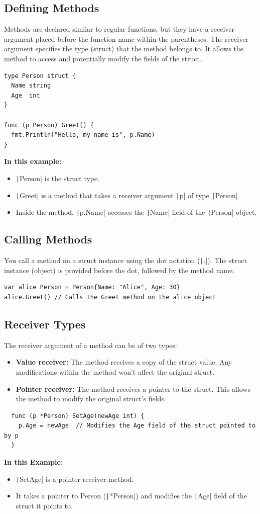 \documentclass[letterpaper,12pt]{article}
\begin{document}
\subsection{Defining Methods}
Methods are declared similar to regular functions, but they have a receiver argument placed before the function name within the parentheses. The receiver argument specifies the type (struct) that the method belongs to. It allows the method to access and potentially modify the fields of the struct.
\begin{verbatim}
type Person struct {
  Name string
  Age  int
}

func (p Person) Greet() {
  fmt.Println("Hello, my name is", p.Name)
}
\end{verbatim}
\textbf{In this example:}
\begin{itemize}
  \item \texttt|Person| is the struct type.
  \item \texttt|Greet| is a method that takes a receiver argument \texttt|p| of type \texttt|Person|.
  \item Inside the method, \texttt|p.Name| accesses the \texttt|Name| field of the \texttt|Person| object.
\end{itemize}
\subsection{Calling Methods}
You call a method on a struct instance using the dot notation (\texttt|.|). The struct instance (object) is provided before the dot, followed by the method name.
\begin{verbatim}
var alice Person = Person{Name: "Alice", Age: 30}
alice.Greet() // Calls the Greet method on the alice object
\end{verbatim}
\subsection{Receiver Types}
The receiver argument of a method can be of two types:
\begin{itemize}
  \item \textbf{Value receiver:} The method receives a copy of the struct value. Any modifications within the method won't affect the original struct.
  \item \textbf{Pointer receiver:} The method receives a pointer to the struct. This allows the method to modify the original struct's fields.
\end{itemize}
\begin{verbatim}
  func (p *Person) SetAge(newAge int) {
    p.Age = newAge  // Modifies the Age field of the struct pointed to by p
  }
\end{verbatim}
\noindent
\textbf{In this Example:}
\begin{itemize}
  \item \texttt|SetAge| is a pointer receiver method.
  \item It takes a pointer to Person (\texttt|*Person|) and modifies the \texttt|Age| field of the struct it points to.
\end{itemize}
\end{document}
